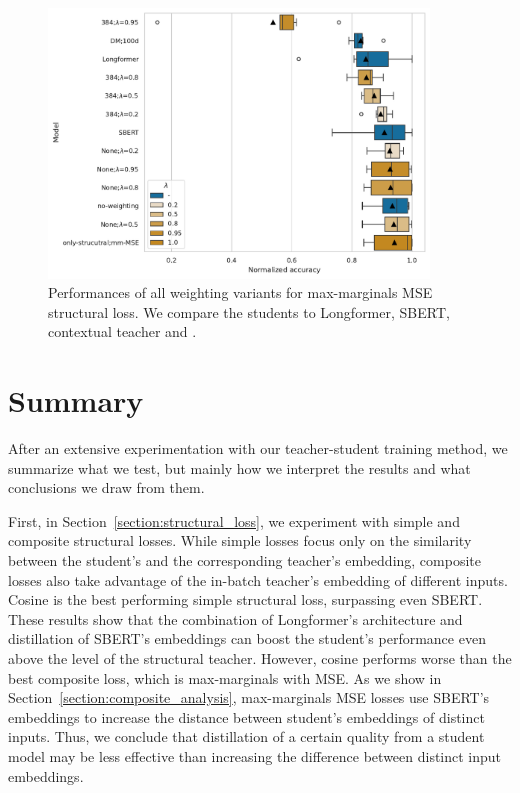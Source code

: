 \begin{figure}

  \includegraphics[width=0.9\textwidth]{img/mm_mse_weighting.pdf}

  \caption{Performances of all weighting variants for max-marginals MSE
  structural loss. We compare the students to Longformer, SBERT,
   contextual teacher and .}

  \label{fig:mm_mse_weighting}

\end{figure}

\section{Summary}\label{section:experiments_summary}

After an extensive experimentation with our teacher-student training method, we
summarize what we test, but mainly how we interpret the results and what
conclusions we draw from them.

First, in Section~\ref{section:structural_loss}, we experiment with simple and
composite structural losses. While simple losses focus only on the similarity
between the student's and the corresponding teacher's embedding, composite
losses also take advantage of the in-batch teacher's embedding of different
inputs. Cosine is the best performing simple structural loss, surpassing even
SBERT. These results show that the combination of Longformer's architecture and
distillation of SBERT's embeddings can boost the student's performance even
above the level of the structural teacher. However, cosine performs worse than
the best composite loss, which is max-marginals with MSE. As we show in
Section~\ref{section:composite_analysis}, max-marginals MSE losses use SBERT's
embeddings to increase the distance between student's embeddings of distinct
inputs. Thus, we conclude that distillation of a certain quality from a student
model may be less effective than increasing the difference between distinct
input embeddings.

